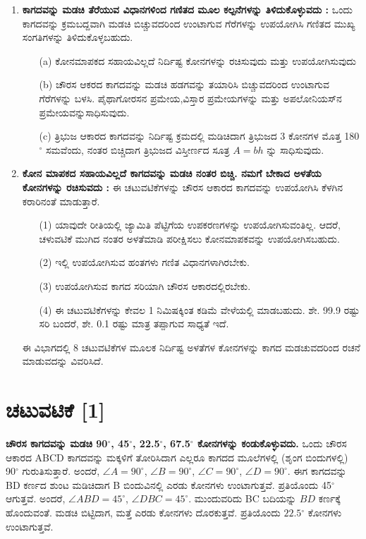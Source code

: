 \begin{enumerate}
\item  \textbf{ಕಾಗದವನ್ನು ಮಡಚಿ ತೆರೆಯುವ ವಿಧಾನಗಳಿಂದ ಗಣಿತದ ಮೂಲ ಕಲ್ಪನೆಗಳನ್ನು ತಿಳಿದುಕೊಳ್ಳುವದು :} ಒಂದು ಕಾಗದವನ್ನು ಕ್ರಮಬದ್ದವಾಗಿ ಮಡಚಿ ಬಿಚ್ಚುವದರಿಂದ ಉಂಟಾಗುವ ಗೆರೆಗಳನ್ನು ಉಪಯೋಗಿಸಿ ಗಣಿತದ ಮುಖ್ಯ ಸಂಗತಿಗಳನ್ನು ತಿಳಿದುಕೊಳ್ಳಬಹುದು.
\smallskip
\begin{itemize}
\item[(a)]  ಕೋನಮಾಪಕದ ಸಹಾಯವಿಲ್ಲದೆ ನಿರ್ದಿಷ್ಟ ಕೋನಗಳನ್ನು ರಚಿಸುವುದು ಮತ್ತು ಉಪಯೋಗಿಸುವುದು 

\smallskip
\item[(b)] ಚೌರಸ ಆಕರದ ಕಾಗದವನ್ನು ಮಡಚಿ ಹಡಗವನ್ನು ತಯಾರಿಸಿ ಬಿಚ್ಚುವದರಿಂದ ಉಂಟಾಗುವ ಗೆರೆಗಳನ್ನು ಬಳಸಿ. ಪೈಥಾಗೋರಸನ ಪ್ರಮೇಯ,\break ವಿಸ್ತಾರ  ಪ್ರಮೇಯಗಳನ್ನು ಮತ್ತು ಅಪಲೋನಿಯಸ್‌ನ ಪ್ರಮೇಯವನ್ನು\break ಸಾಧಿಸುವುದು. 

\smallskip
\item[(c)] ತ್ರಿಭುಜ ಆಕಾರದ ಕಾಗದವನ್ನು ನಿರ್ದಿಷ್ಟ ಕ್ರಮದಲ್ಲಿ ಮಡಿಚಿದಾಗ ತ್ರಿಭುಜದ 3 ಕೋನಗಳ ಮೊತ್ತ  180$^{\circ}$ ಸಮವೆಂದು, ನಂತರ ಬಿಚ್ಚಿದಾಗ ತ್ರಿಭುಜದ ವಿಸ್ತೀರ್ಣದ ಸೂತ್ರ $A=bh$ ನ್ನು ಸಾಧಿಸುವುದು. 
\end{itemize}

\eject

\item  \textbf{ಕೋನ ಮಾಪಕದ ಸಹಾಯವಿಲ್ಲದೆ ಕಾಗದವನ್ನು ಮಡಚಿ ನಂತರ ಬಿಚ್ಚಿ. ನಮಗೆ ಬೇಕಾದ ಅಳತೆಯ ಕೋನಗಳನ್ನು ರಚಿಸುವದು :} ಈ ಚಟುವಟಿಕೆಗಳನ್ನು ಚೌರಸ ಆಕಾರದ ಕಾಗದವನ್ನು ಉಪಯೋಗಿಸಿ ಕೆಳಗಿನ ಕರಾರಿನಂತೆ ಮಾಡುತ್ತಾರೆ. 
\smallskip
\begin{itemize}
\item[(1)] ಯಾವುದೇ ರೀತಿಯಲ್ಲಿ ಜ್ಯಾಮಿತಿ ಪೆಟ್ಟಿಗೆಯ ಉಪಕರಣಗಳನ್ನು ಉಪಯೋಗಿಸುವಂತಿಲ್ಲ. ಆದರೆ, ಚಳುವಟಿಕೆ ಮುಗಿದ ನಂತರ ಅಳತೆಮಾಡಿ ಪರೀಕ್ಷಿ\-ಸಲು ಕೋನಮಾಪಕವನ್ನು ಉಪಯೋಗಿಸಬಹುದು.

\smallskip
\item[(2)] ಇಲ್ಲಿ ಉಪಯೋಗಿಸುವ ಹಂತಗಳು ಗಣಿತ  ವಿಧಾನಗಳಾಗಿರಬೇಕು.

\smallskip
\item[(3)] ಉಪಯೋಗಿಸುವ ಕಾಗದ ಸರಿಯಾಗಿ ಚೌರಸ ಆಕಾರದಲ್ಲಿರಬೇಕು.

\smallskip
\item[(4)] ಈ ಚಟುವಟಿಕೆಗಳನ್ನು ಕೇವಲ 1 ನಿಮಿಷಕ್ಕಿಂತ ಕಡಿಮೆ ವೇಳೆಯಲ್ಲಿ ಮಾಡಬಹುದು. ಶೇ.  99.9 ರಷ್ಟು ಸರಿ ಬಂದರೆ, ಶೇ.  0.1 ರಷ್ಟು ಮಾತ್ರ ತಪ್ಪಾಗುವ ಸಾಧ್ಯತೆ ಇದೆ. 
\end{itemize}

ಈ ವಿಭಾಗದಲ್ಲಿ 8 ಚಟುವಟಿಕೆಗಳ ಮೂಲಕ ನಿರ್ದಿಷ್ಟ ಅಳತೆಗಳ ಕೋನಗಳನ್ನು ಕಾಗದ ಮಡಚುವದರಿಂದ ರಚನೆ ಮಾಡುವದನ್ನು ವಿವರಿಸಿದೆ. 
\end{enumerate}

\section*{ಚಟುವಟಿಕೆ [1]}
\textbf{ಚೌರಸ ಕಾಗದವನ್ನು ಮಡಚಿ 90$^\circ$,  45$^\circ$, 22.5$^\circ$, 67.5$^\circ$ ಕೋನಗಳನ್ನು ಕಂಡುಕೊಳ್ಳು\-ವದು.} ಒಂದು ಚೌರಸ ಆಕಾರದ ABCD ಕಾಗದವನ್ನು ಮಕ್ಕಳಿಗೆ ತೋರಿಸಿದಾಗ ಎಲ್ಲರೂ ಕಾಗದದ ಮೂಲೆಗಳಲ್ಲಿ (ಶೃಂಗ ಬಿಂದುಗಳಲ್ಲಿ) 90$^\circ$ ಗುರುತಿಸುತ್ತಾರೆ. ಅಂದರೆ, $\angle{A} = 90^\circ$, $\angle{B} = 90^\circ$, $\angle{C} = 90^\circ$, $\angle{D} = 90^\circ$. ಈಗ ಕಾಗದವನ್ನು BD ಕರ್ಣದ ಶುಂಟ ಮಡಿಚಿದಾಗ B ಬಿಂದುವಿನಲ್ಲಿ ಎರಡು ಕೋನಗಳು ಉಂಟಾಗುತ್ತವೆ. ಪ್ರತಿಯೊಂದು  45$^\circ$ ಆಗುತ್ತವೆ. ಅಂದರೆ,  $\angle ABD=45^{\circ}$,  $\angle DBC = 45^\circ$. ಮುಂದುವರಿದು  BC ಬದಿಯನ್ನು $BD$ ಕರ್ಣಕ್ಕೆ ಹೊಂದುವಂತೆ. ಮಡಚಿ ಬಿಟ್ಟಿದಾಗ, ಮತ್ತೆ ಎರಡು ಕೋನಗಳು ದೊರಕುತ್ತವೆ. ಪ್ರತಿಯೊಂದು $22.5{^\circ}$ ಕೋನಗಳು ಉಂಟಾಗುತ್ತವೆ. 

